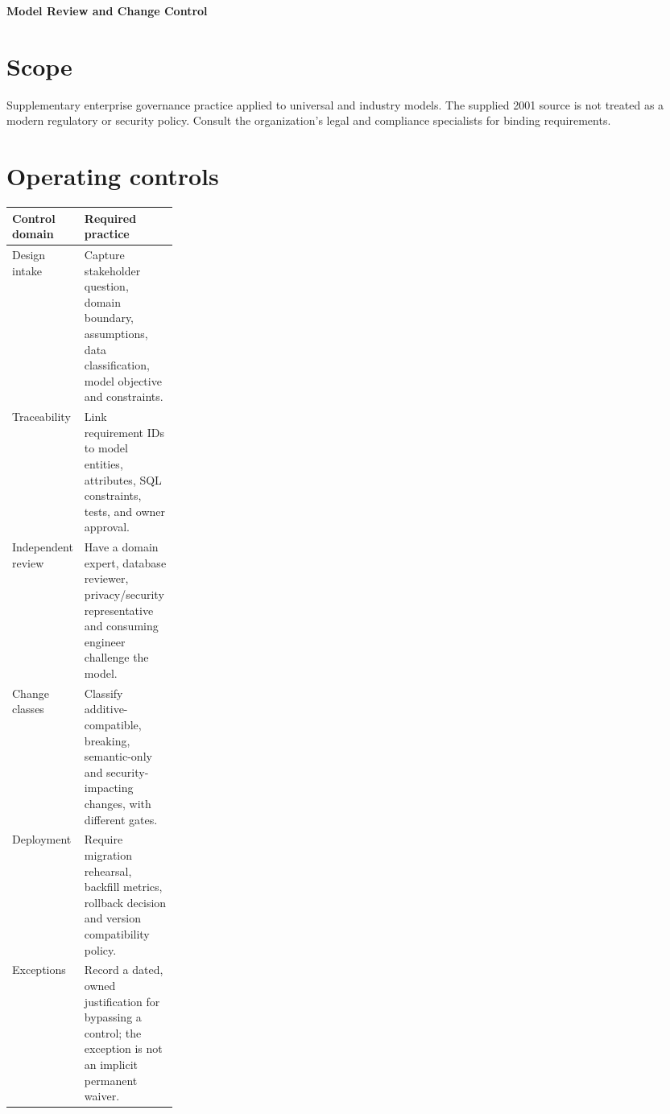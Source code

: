 \documentclass[11pt,letterpaper]{article}
\begin{document}
\begin{center}
{\LARGE\bfseries\color{navy} Model Review and Change Control}\par
\vspace{0.25em}{\large Supplementary governance reference}\par
{}
\end{center}
\vspace{0.8em}
\section{Scope}
Supplementary enterprise governance practice applied to universal and industry models. The supplied 2001 source is not treated as a modern regulatory or security policy. Consult the organization's legal and compliance specialists for binding requirements.


\section{Operating controls}
\begin{tabularx}{\linewidth}{@{}>{\raggedright\arraybackslash}p{0.24\linewidth}>{\raggedright\arraybackslash}X@{}}
\toprule
\textbf{Control domain} & \textbf{Required practice} \\ 
\midrule
Design intake & Capture stakeholder question, domain boundary, assumptions, data classification, model objective and constraints. \\ 
Traceability & Link requirement IDs to model entities, attributes, SQL constraints, tests, and owner approval. \\ 
Independent review & Have a domain expert, database reviewer, privacy/security representative and consuming engineer challenge the model. \\ 
Change classes & Classify additive-compatible, breaking, semantic-only and security-impacting changes, with different gates. \\ 
Deployment & Require migration rehearsal, backfill metrics, rollback decision and version compatibility policy. \\ 
Exceptions & Record a dated, owned justification for bypassing a control; the exception is not an implicit permanent waiver. \\ 
\bottomrule
\end{tabularx}
\end{document}
